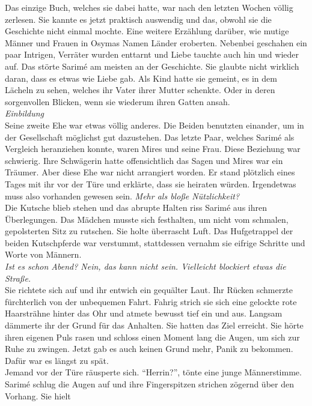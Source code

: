 Das einzige Buch, welches sie dabei hatte, war nach den letzten Wochen völlig zerlesen. Sie kannte 
es jetzt praktisch auswendig und das, obwohl sie die Geschichte nicht einmal mochte. Eine weitere 
Erzählung darüber, wie mutige Männer und Frauen in Osymas Namen Länder eroberten. Nebenbei geschahen 
ein paar Intrigen, Verräter wurden enttarnt und Liebe tauchte auch hin und wieder auf. Das störte 
Sarimé am meisten an der Geschichte. Sie glaubte nicht wirklich daran, dass es etwas wie Liebe gab. 
Als Kind hatte sie gemeint, es in dem Lächeln zu sehen, welches ihr Vater ihrer Mutter schenkte. 
Oder in deren sorgenvollen Blicken, wenn sie wiederum ihren Gatten ansah. \\
\textit{Einbildung}\\
Seine zweite Ehe war etwas völlig anderes. Die Beiden benutzten einander, um in der Gesellschaft 
möglichst gut dazustehen. Das letzte Paar, welches Sarimé als Vergleich heranziehen konnte, waren 
Mires und seine Frau. Diese Beziehung war schwierig. Ihre Schwägerin hatte offensichtlich das Sagen 
und Mires war ein Träumer. Aber diese Ehe war nicht arrangiert worden. Er stand plötzlich eines 
Tages mit ihr vor der Türe und erklärte, dass sie heiraten würden. Irgendetwas muss also vorhanden 
gewesen sein. \textit{Mehr als bloße Nützlichkeit?}\\
Die Kutsche blieb stehen und das abrupte Halten riss Sarimé aus ihren Überlegungen. Das Mädchen 
musste sich festhalten, um nicht vom schmalen, gepolsterten Sitz zu rutschen. Sie holte überrascht 
Luft. Das Hufgetrappel der beiden Kutschpferde war verstummt, stattdessen vernahm sie eifrige 
Schritte und Worte von Männern. \\
\textit{Ist es schon Abend? Nein, das kann nicht sein. Vielleicht blockiert etwas die Straße.}\\
Sie richtete sich auf und ihr entwich ein gequälter Laut. Ihr Rücken schmerzte fürchterlich von der 
unbequemen Fahrt. Fahrig strich sie sich eine gelockte rote Haarsträhne hinter das Ohr und atmete 
bewusst tief ein und aus. Langsam dämmerte ihr der Grund für das Anhalten. Sie hatten das Ziel 
erreicht. Sie hörte ihren eigenen Puls rasen und schloss einen Moment lang die Augen, um sich zur 
Ruhe zu zwingen. Jetzt gab es auch keinen Grund mehr, Panik zu bekommen. Dafür war es längst zu 
spät.\\
Jemand vor der Türe räusperte sich. ``Herrin?'', tönte eine junge Männerstimme.\\
Sarimé schlug die Augen auf und ihre Fingerspitzen strichen zögernd über den Vorhang. Sie hielt 
